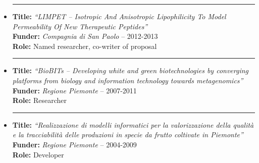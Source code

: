 \documentclass[a4paper,10pt]{article}
\newcommand{\noitem}{\item[]}
\begin{document}
\begin{itemize}[leftmargin=*,itemsep=1.2ex]
	\noitem\rule{1mm}{0pt}  \begin{minipage}[t]{0.94\textwidth}
		\textbf{Title:} \emph{``LIMPET -- Isotropic And Anisotropic Lipophilicity To Model Permeability Of New Therapeutic Peptides''}\\
		\textbf{Funder:} \emph{Compagnia di San Paolo} -- 2012-2013\\
		\textbf{Role:} Named researcher, co-writer of proposal
	\end{minipage}	

	\noitem\rule{1mm}{0pt}   \begin{minipage}[t]{0.94\textwidth}
		\textbf{Title:} \emph{``BioBITs -- Developing white and green biotechnologies by converging platforms from biology and information technology towards metagenomics''}\\
		\textbf{Funder:} \emph{Regione Piemonte} -- 2007-2011\\
		\textbf{Role:} Researcher
	\end{minipage}
	
	\noitem\rule{1mm}{0pt}  \begin{minipage}[t]{0.94\textwidth}
		\textbf{Title:} \emph{``Realizzazione di modelli informatici per la valorizzazione della qualit\`a e la tracciabilit\`a delle produzioni in specie da frutto coltivate in Piemonte''}\\
		\textbf{Funder:} \emph{Regione Piemonte} -- 2004-2009\\
		\textbf{Role:} Developer
	\end{minipage}
			
\end{itemize}

\vspace{0.4cm}

\end{document}
